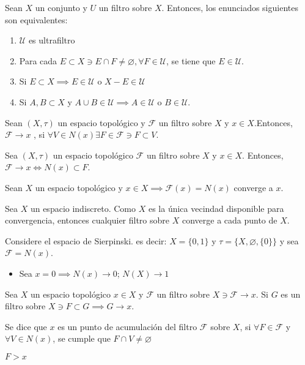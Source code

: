 \documentclass[a4paper, 12pt]{article}
\begin{document}
 \begin{teorema}
    Sean $X$ un conjunto y $U$ un filtro sobre $X$. Entonces, los enunciados siguientes son equivalentes: 
    \begin{enumerate}
        \item $\mathcal{U}$ es ultrafiltro
        \item Para cada $E\subset X\ni E\cap F\neq \varnothing,\forall F\in \mathcal{U}$, se tiene que $E\in \mathcal{U}$.
        \item Si $E\subset X\implies E\in \mathcal{U}$ o $ X-E\in \mathcal{U}$
        \item Si $A,B\subset X$ y $A\cup B \in \mathcal{U}\implies A\in \mathcal{U}$ o $B\in \mathcal{U}$. 
    \end{enumerate}
\end{teorema}

\begin{definicion}
    Sean $(X,\tau)$ un espacio topológico y $\mathcal{F}$ un filtro sobre $X$ y $x\in X$.Entonces, $\mathcal{F}\to x$
    , si $\forall V\in N(x)\exists F\in \mathcal{F}\ni F\subset V$.
\end{definicion}

\begin{teorema}
    Sea $(X,\tau)$ un espacio topológico $\mathcal{F}$ un filtro sobre $X$ y $x\in X$. Entonces, $\mathcal{F}\to x\iff N(x)\subset F$. 
\end{teorema}

\begin{ejemplo}
    Sean $X$ un espacio topológico y $x\in X\implies \mathcal{F}(x)=N(x)$ converge a $x$. 
\end{ejemplo}

\begin{ejemplo}
    Sea $X$ un espacio indiscreto. Como $X$ es la única vecindad disponible para convergencia, entonces cualquier filtro sobre $X$ converge a cada punto de $X$. 
\end{ejemplo}

\begin{ejemplo}
    Considere el espacio de Sierpinski. es decir: $X=\{0,1\}$ y $\tau=\{X,\varnothing, \{0\}\}$ y sea $\mathcal{F}=N(x)$. 
    \begin{itemize}
        \item Sea $x=0\implies N(x)\to 0$; $N(X)\to 1$
    \end{itemize}
\end{ejemplo}

\begin{teorema}
    Sea $X$ un espacio topológico $x\in X$ y $\mathcal{F}$ un filtro sobre $X\ni \mathcal{F}\to x$. Si $G$ es un filtro sobre $X\ni F\subset G\implies G\to x$. 
\end{teorema}

\begin{definicion}
    Se dice que $x$ es un punto de acumulación del filtro $\mathcal{F}$ sobre $X$, si $\forall F\in \mathcal{F}$ y $\forall V\in N(x)$, se cumple que $F\cap V\neq \varnothing$ 
    \begin{nota}
        $F>x$
    \end{nota}
\end{definicion}


\newpage
\end{document}
